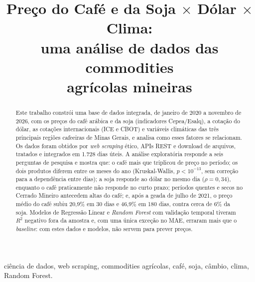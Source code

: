 \documentclass[conference]{IEEEtran}
\begin{document}
\title{Preço do Café e da Soja $\times$ Dólar $\times$ Clima:\\
uma análise de dados das commodities\\ agrícolas mineiras}

\author{
\and
{}
}

\maketitle

\begin{abstract}
Este trabalho constrói uma base de dados integrada, de janeiro de 2020 a novembro de 2026, com os
preços do café arábica e da soja (indicadores Cepea/Esalq), a cotação do dólar, as cotações
internacionais (ICE e CBOT) e variáveis climáticas das três principais regiões cafeeiras de Minas Gerais,
e analisa como esses fatores se relacionam. Os dados foram obtidos por \emph{web scraping} ético, APIs
REST e download de arquivos, tratados e integrados em 1.728 dias úteis. A análise exploratória
responde a seis perguntas de pesquisa e mostra que: o café mais que triplicou de preço no período; os dois produtos diferem entre os meses do ano (Kruskal-Wallis, $p<10^{-13}$, sem correção para a dependência entre dias); a soja responde ao dólar
no mesmo dia ($\rho=0{,}34$), enquanto o café praticamente não responde no curto prazo; períodos
quentes e secos no Cerrado Mineiro antecedem altas do café; e, após a geada de julho de 2021, o preço médio do café subiu 20,9\% em 30 dias e 46,9\% em 180 dias, contra cerca de 6\% da soja. Modelos de Regressão Linear e
\emph{Random Forest} com validação temporal tiveram $R^2$ negativo fora da amostra e, com uma única exceção no MAE, erraram mais que o \emph{baseline}: com estes dados e modelos, não servem para prever preços.
\end{abstract}

\begin{IEEEkeywords}
ciência de dados, web scraping, commodities agrícolas, café, soja, câmbio, clima, Random Forest.
\end{IEEEkeywords}
\end{document}
